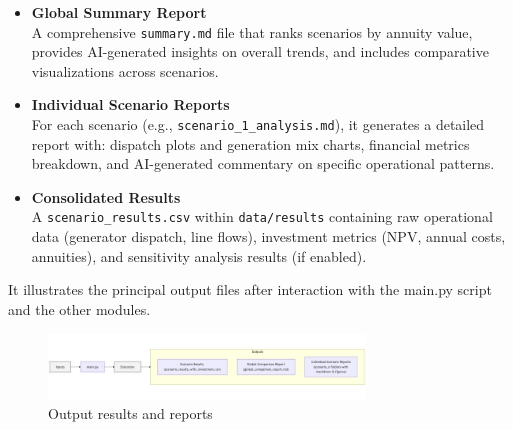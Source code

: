 \begin{itemize}
    \item \textbf{Global Summary Report}\\
    A comprehensive \texttt{summary.md} file that ranks scenarios by annuity value, 
    provides AI-generated insights on overall trends, and includes comparative visualizations across scenarios.

    \item \textbf{Individual Scenario Reports}\\
    For each scenario (e.g., \texttt{scenario\_1\_analysis.md}), it generates a 
    detailed report with: dispatch plots and generation mix charts, financial metrics breakdown, and AI-generated 
    commentary on specific operational patterns.

    \item \textbf{Consolidated Results}\\
    A \texttt{scenario\_results.csv} within \texttt{data/results} containing raw operational
    data (generator dispatch, line flows), investment metrics (NPV, annual costs, annuities), and sensitivity 
    analysis results (if enabled).
\end{itemize}

\noindent
It illustrates the principal output files after interaction with the main.py script and the other modules.

\begin{figure}[H]
    \centering
    \includegraphics[width=0.75\textwidth]{images/output-flow.jpeg}
    \caption{Output results and reports}
    \label{fig:output-flow}
\end{figure}


